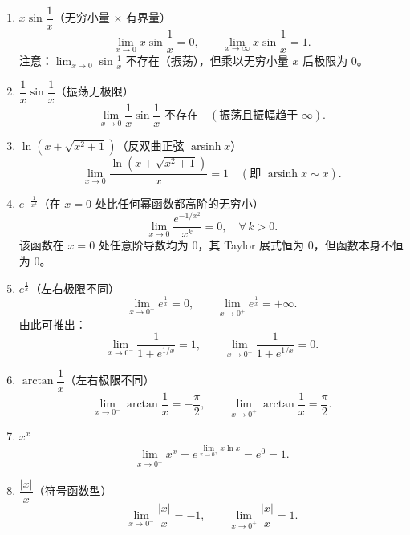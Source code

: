 \documentclass[../book.tex]{subfiles}
\begin{document}
    \begin{enumerate}
        \item \textbf{$x\sin\dfrac{1}{x}$}（无穷小量 $\times$ 有界量）
        \[
            \lim_{x \to 0} x\sin\frac{1}{x} = 0, \qquad
            \lim_{x \to \infty} x\sin\frac{1}{x} = 1.
        \]
        注意：$\displaystyle\lim_{x \to 0} \sin\frac{1}{x}$ {\color{red}不存在}（振荡），但乘以无穷小量 $x$ 后极限为 $0$。

        \item \textbf{$\dfrac{1}{x}\sin\dfrac{1}{x}$}（振荡无极限）
        \[
            \lim_{x \to 0} \frac{1}{x}\sin\frac{1}{x} \text{ 不存在} \quad (\text{振荡且振幅趋于 } \infty).
        \]

        \item \textbf{$\ln(x + \sqrt{x^2 + 1})$}（反双曲正弦 $\operatorname{arsinh}x$）
        \[
            \lim_{x \to 0} \frac{\ln(x + \sqrt{x^2 + 1})}{x} = 1 \quad (\text{即 } \operatorname{arsinh}x \sim x).
        \]

        \item \textbf{$e^{-\frac{1}{x^2}}$}（在 $x=0$ 处比任何幂函数都高阶的无穷小）
        \[
            \lim_{x \to 0} \frac{e^{-1/x^2}}{x^k} = 0, \quad \forall\, k > 0.
        \]
        该函数在 $x=0$ 处任意阶导数均为 $0$，其 Taylor 展式恒为 $0$，但函数本身不恒为 $0$。

        \item \textbf{$e^{\frac{1}{x}}$}（左右极限不同）
        \[
            \lim_{x \to 0^-} e^{\frac{1}{x}} = 0, \qquad
            \lim_{x \to 0^+} e^{\frac{1}{x}} = +\infty.
        \]
        由此可推出：
        \[
            \lim_{x \to 0^-} \frac{1}{1 + e^{1/x}} = 1, \qquad
            \lim_{x \to 0^+} \frac{1}{1 + e^{1/x}} = 0.
        \]

        \item \textbf{$\arctan\dfrac{1}{x}$}（左右极限不同）
        \[
            \lim_{x \to 0^-} \arctan\frac{1}{x} = -\frac{\pi}{2}, \qquad
            \lim_{x \to 0^+} \arctan\frac{1}{x} = \frac{\pi}{2}.
        \]

        \item \textbf{$x^x$}
        \[
            \lim_{x \to 0^+} x^x = e^{\lim_{x \to 0^+} x\ln x} = e^0 = 1.
        \]

        \item \textbf{$\dfrac{|x|}{x}$}（符号函数型）
        \[
            \lim_{x \to 0^-} \frac{|x|}{x} = -1, \qquad
            \lim_{x \to 0^+} \frac{|x|}{x} = 1.
        \]


\end{enumerate}
\end{document}
